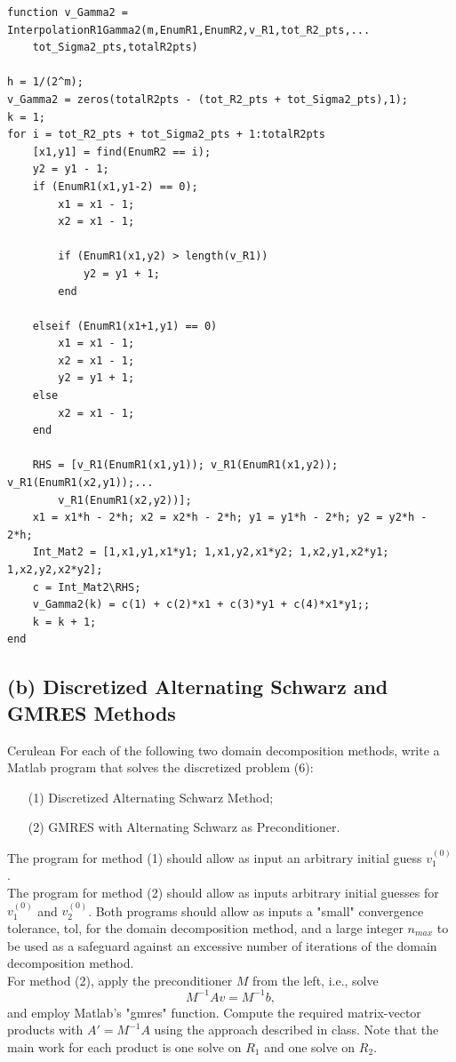 \documentclass[12pt]{article}
\begin{document}
\lstset{language=matlab,frame=single}
\begin{lstlisting}[caption=Interpolation Operator on $R_1$ for $\Gamma_2$]
function v_Gamma2 = InterpolationR1Gamma2(m,EnumR1,EnumR2,v_R1,tot_R2_pts,...
    tot_Sigma2_pts,totalR2pts)

h = 1/(2^m);
v_Gamma2 = zeros(totalR2pts - (tot_R2_pts + tot_Sigma2_pts),1);
k = 1;
for i = tot_R2_pts + tot_Sigma2_pts + 1:totalR2pts
    [x1,y1] = find(EnumR2 == i);
    y2 = y1 - 1;
    if (EnumR1(x1,y1-2) == 0);
        x1 = x1 - 1;
        x2 = x1 - 1;
        
        if (EnumR1(x1,y2) > length(v_R1))
            y2 = y1 + 1;
        end
          
    elseif (EnumR1(x1+1,y1) == 0)
        x1 = x1 - 1;
        x2 = x1 - 1;
        y2 = y1 + 1;
    else
        x2 = x1 - 1;
    end
    
    RHS = [v_R1(EnumR1(x1,y1)); v_R1(EnumR1(x1,y2)); v_R1(EnumR1(x2,y1));...
        v_R1(EnumR1(x2,y2))];
    x1 = x1*h - 2*h; x2 = x2*h - 2*h; y1 = y1*h - 2*h; y2 = y2*h - 2*h;
    Int_Mat2 = [1,x1,y1,x1*y1; 1,x1,y2,x1*y2; 1,x2,y1,x2*y1; 1,x2,y2,x2*y2];
    c = Int_Mat2\RHS;
    v_Gamma2(k) = c(1) + c(2)*x1 + c(3)*y1 + c(4)*x1*y1;;
    k = k + 1;
end
\end{lstlisting}




\subsection{(b) Discretized Alternating Schwarz and GMRES Methods}\begin{mybox}{Cerulean}{}
For each of the following two domain decomposition methods, write a Matlab program that solves the discretized problem (6):
\begin{itemize}
\item[(1)] Discretized Alternating Schwarz Method;
\item[(2)] GMRES with Alternating Schwarz as Preconditioner.
\end{itemize}
The program for method (1) should allow as input an arbitrary initial guess $v_1^{(0)}$.\\
The program for method (2) should allow as inputs arbitrary initial guesses for $v_1^{(0)}$ and $v_2^{(0)}$.  Both programs should allow as inputs a "small" convergence tolerance, tol, for the domain decomposition method, and a large integer $n_{max}$ to be used as a safeguard against an excessive number of iterations of the domain decomposition method.\\
For method (2), apply the preconditioner $M$ from the left, i.e., solve
$$M^{-1}Av = M^{-1}b,$$
and employ Matlab's "gmres" function.  Compute the required matrix-vector products with $A' = M^{-1}A$ using the approach described in class.  Note that the main work for each product is one solve on $R_1$ and one solve on $R_2$.\\
\end{mybox}\text{ }\\
\end{document}
